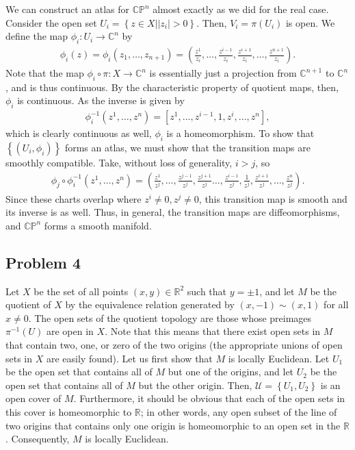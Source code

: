 \documentclass{mathnotes}
\begin{document}
We can construct an atlas for $\mathbb{C}\mathbb{P}^n$ almost exactly as we did for the real case. Consider the open set $U_i=\left\{z\in X \big| |z_i|>0 \right\}$. Then, $V_i=\pi(U_i)$ is open.
We define the map $\phi_i:U_i\to\mathbb{C}^n$ by
\begin{align*}
    \phi_i(z)=\phi_i(z_1, \ldots, z_{n+1})=\left( \frac{z^1}{z_i}, \ldots, \frac{z^{i-1}}{z_i}, \frac{z^{i+1}}{z_i}, \ldots,\frac{z^{n+1}}{z_i}\right).
\end{align*}
Note that the map $\phi_i\circ\pi:X\to\mathbb{C}^n$ is essentially just a projection from $\mathbb{C}^{n+1}$ to $\mathbb{C}^n$, and is thus continuous. By the characteristic
property of quotient maps, then, $\phi_i$ is continuous. As the inverse is given by
\begin{align*}
    \phi_i^{-1}(z^1, \ldots, z^n)=[z^1, \ldots, z^{i-1}, 1, z^i, \ldots, z^n],
\end{align*}
which is clearly continuous as well, $\phi_i$ is a homeomorphism. To show that $\left\{ (U_i,\phi_i) \right\}$ forms an atlas, we must show that the transition maps are
smoothly compatible. Take, without loss of generality, $i>j$, so
\begin{align*}
    \phi_j\circ\phi_i^{-1}(z^1, \ldots, z^n)=\left( \frac{z^1}{z^j}, \ldots, \frac{z^{j-1}}{z^j}, \frac{z^{j+1}}{z^j} \ldots, \frac{z^{i-1}}{z^j}, \frac{1}{z^j}, \frac{z^{i+1}}{z^j}, \ldots, \frac{z^n}{z^j}  \right).
\end{align*}
Since these charts overlap where $z^i\neq0, z^j\neq 0$, this transition map is smooth and its inverse is as well. Thus, in general, the transition maps
are diffeomorphisms, and $\mathbb{C}\mathbb{P}^n$ forms a smooth manifold.

\subsection*{Problem 4}

Let $X$ be the set of all points $(x,y)\in\mathbb{R}^2$ such that $y=\pm 1$, and let $M$ be the quotient of $X$ by the equivalence relation generated
by $(x,-1)\sim(x,1)$ for all $x\neq 0$. The open sets of the quotient topology are those whose preimages $\pi^{-1}(U)$ are open in $X$. Note that this means
that there exist open sets in $M$ that contain two, one, or zero of the two origins (the appropriate unions of open sets in $X$ are easily found). Let us first show that $M$
is locally Euclidean. Let $U_1$ be the open set that contains all of $M$ but one of the origins, and let $U_2$ be the open set that contains all of $M$ but the other origin.
Then, $\mathcal{U}=\left\{ U_1, U_2 \right\}$ is an open cover of $M$.
Furthermore, it should be obvious that each of the open sets in this cover is homeomorphic to $\mathbb{R}$;
in other words, any open subset of the line of two origins that contains only one origin is homeomorphic to an open set in the $\mathbb{R}$. Consequently,
$M$ is locally Euclidean.
\end{document}

